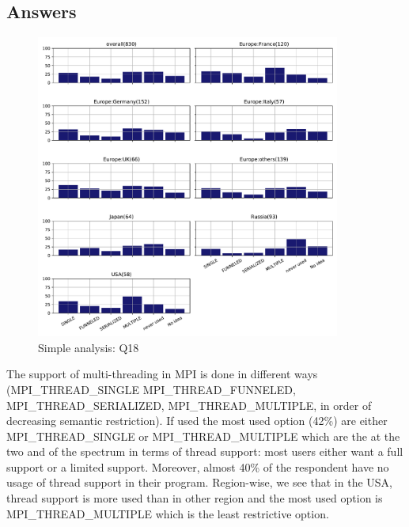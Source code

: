 
\subsection{Answers}


\begin{figure}[htb]
\begin{center}
\includegraphics[width=10cm]{../pdfs/Q18.pdf}
\caption{Simple analysis: Q18}
\label{fig:Q18}
\end{center}
\end{figure}

The support of multi-threading in MPI is done in different ways (MPI\_THREAD\_SINGLE
MPI\_THREAD\_FUNNELED, MPI\_THREAD\_SERIALIZED, MPI\_THREAD\_MULTIPLE, in order of
decreasing semantic restriction). If used the most used option (42\%) are either
MPI\_THREAD\_SINGLE or MPI\_THREAD\_MULTIPLE which are the at the two and of the
spectrum in terms of thread support: most users either want a full support or a
limited support. Moreover, almost 40\% of the respondent have no usage of thread
support in their program. Region-wise, we see that in the USA, thread support is more used
than in other region and the most used option is MPI\_THREAD\_MULTIPLE which is
the least restrictive option. 

